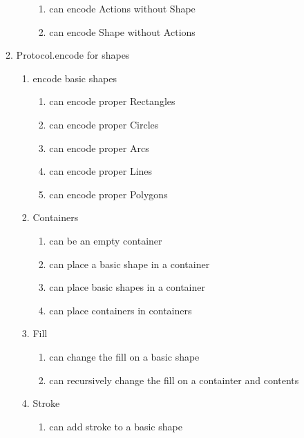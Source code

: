 \begin{enumerate}[label={T\arabic*}]
\begin{enumerate}[label={T\arabic{enumi}.\arabic*}]
\begin{enumerate}[label={T\arabic{enumi}.\arabic{enumii}.\arabic*}]
\begin{enumerate}[label={T\arabic{enumi}.\arabic{enumii}.\arabic{enumiii}.\arabic*}]
            	\item can encode Actions without Shape
            	\item can encode Shape without Actions
            \end{enumerate}
        \end{enumerate}
	    \item Protocol.encode for shapes
	    \begin{enumerate}[label={T\arabic{enumi}.\arabic{enumii}.\arabic*}]
	        \item encode basic shapes
	        \begin{enumerate}[label={T\arabic{enumi}.\arabic{enumii}.\arabic{enumiii}.\arabic*}]
            	\item can encode proper Rectangles
            	\item can encode proper Circles
            	\item can encode proper Arcs
            	\item can encode proper Lines
            	\item can encode proper Polygons
            \end{enumerate}
	        \item Containers
	        \begin{enumerate}[label={T\arabic{enumi}.\arabic{enumii}.\arabic{enumiii}.\arabic*}]
            	\item can be an empty container
            	\item can place a basic shape in a container
            	\item can place basic shapes in a container
            	\item can place containers in containers
            \end{enumerate}
	        \item Fill
	        \begin{enumerate}[label={T\arabic{enumi}.\arabic{enumii}.\arabic{enumiii}.\arabic*}]
            	\item can change the fill on a basic shape
            	\item can recursively change the fill on a containter and contents
            \end{enumerate}
	        \item Stroke
	        \begin{enumerate}[label={T\arabic{enumi}.\arabic{enumii}.\arabic{enumiii}.\arabic*}]
            	\item can add stroke to a basic shape

\end{enumerate}
\end{enumerate}
\end{enumerate}
\end{enumerate}
